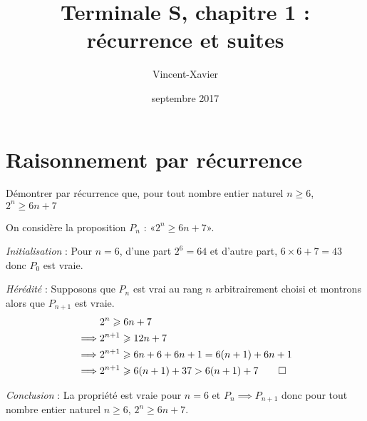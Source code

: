 \documentclass[12pt,a4paper,french]{article}
\author{Vincent-Xavier \bsc{Jumel}}
\title{Terminale S, chapitre 1 : récurrence et suites}
\date{septembre 2017}
\begin{document}
\maketitle

\section{Raisonnement par récurrence}

\begin{question}[subtitle={Récurrence}]
  Démontrer par récurrence que, pour tout nombre entier naturel $n \geqslant
  6$, $2^n \geqslant 6n + 7$
\end{question}
\begin{solution}
  On considère la proposition $P_n$ : «$2^n \geqslant 6n + 7$».

  \emph{Initialisation} : Pour $n = 6$, d'une part $2^6 = 64$ et d'autre
  part, $6 \times 6 + 7 = 43$ donc $P_0$ est vraie.

  \emph{Hérédité} : Supposons que $P_n$ est vrai au rang $n$ arbitrairement
  choisi et montrons alors que $P_{n+1}$ est vraie.
  \begin{align*}
             & 2^n \geqslant 6n + 7                                \\
    \implies & 2^{n+1} \geqslant 12n + 7                           \\
    \implies & 2^{n+1} \geqslant 6n + 6 + 6n + 1 = 6(n+1) + 6n + 1 \\
    \implies & 2^{n+1} \geqslant 6(n+1) + 37 > 6(n+1) + 7 \qed
  \end{align*}

  \emph{Conclusion} : La propriété est vraie pour $n = 6$ et $P_n \implies
  P_{n+1}$ donc pour tout nombre entier naturel $n \geqslant 6$, $2^n
  \geqslant 6n + 7$.
\end{solution}
\end{document}
